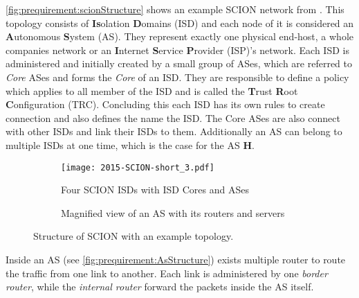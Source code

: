 \documentclass[thesis.tex]{subfiles}
\begin{document}
\autoref{fig:prequirement:scionStructure} shows an example SCION network from \cite{SCIONPaper}. This topology consists of \textbf{Is}olation \textbf{D}omains (ISD) and each node of it is considered an \textbf{A}utonomous \textbf{S}ystem (AS). They represent exactly one physical end-host, a whole companies network or an \textbf{I}nternet \textbf{S}ervice \textbf{P}rovider (ISP)'s network. Each ISD is administered and initially created by a small group of ASes, which are referred to \textit{Core} ASes and forms the \textit{Core} of an ISD. They are responsible to define a policy which applies to all member of the ISD and is called the \textbf{T}rust \textbf{R}oot \textbf{C}onfiguration (TRC). Concluding this each ISD has its own rules to create connection and also defines the name the ISD. The Core ASes are also connect with other ISDs and link their ISDs to them. Additionally an AS can belong to multiple ISDs at one time, which is the case for the AS \textbf{H}.



\begin{figure}[h]
	\centering
	\begin{subfigure}{.48\linewidth}
		\centering
		\texttt{[image: 2015-SCION-short\_3.pdf]}
		\caption{Four SCION ISDs with ISD Cores and ASes \cite[Figure~1]{SCIONPaper}}
		\label{fig:prequirement:scionStructure}
	\end{subfigure}
	\hfill
	\begin{subfigure}{0.48\linewidth}
		\centering
		\caption{Magnified view of an AS with its routers and servers \cite[Figure~2b]{SCIONPaper}}
		\label{fig:prequirement:AsStructure}
	\end{subfigure}
	\caption{Structure of SCION with an example topology.}
	\label{fig:prequirement:structureOfScion}
\end{figure}

Inside an AS (see \autoref{fig:prequirement:AsStructure}) exists multiple router to route the traffic from one link to another. Each link is administered by one \textit{border router}, while the \textit{internal router} forward the packets inside the AS itself.
\end{document}
